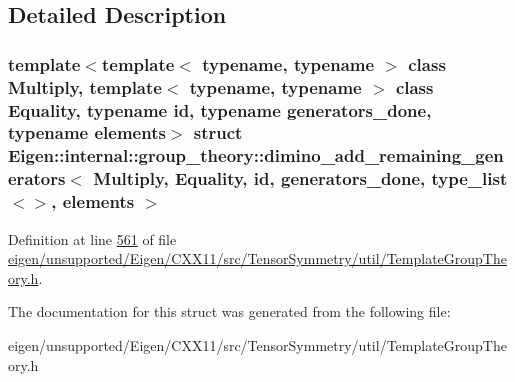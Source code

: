 \subsection{Detailed Description}
\subsubsection*{template$<$template$<$ typename, typename $>$ class Multiply, template$<$ typename, typename $>$ class Equality, typename id, typename generators\+\_\+done, typename elements$>$\newline
struct Eigen\+::internal\+::group\+\_\+theory\+::dimino\+\_\+add\+\_\+remaining\+\_\+generators$<$ Multiply, Equality, id, generators\+\_\+done, type\+\_\+list$<$$>$, elements $>$}



Definition at line \hyperlink{eigen_2unsupported_2_eigen_2_c_x_x11_2src_2_tensor_symmetry_2util_2_template_group_theory_8h_source_l00561}{561} of file \hyperlink{eigen_2unsupported_2_eigen_2_c_x_x11_2src_2_tensor_symmetry_2util_2_template_group_theory_8h_source}{eigen/unsupported/\+Eigen/\+C\+X\+X11/src/\+Tensor\+Symmetry/util/\+Template\+Group\+Theory.\+h}.



The documentation for this struct was generated from the following file\+:\begin{DoxyCompactItemize}
\item 
eigen/unsupported/\+Eigen/\+C\+X\+X11/src/\+Tensor\+Symmetry/util/\+Template\+Group\+Theory.\+h\end{DoxyCompactItemize}
